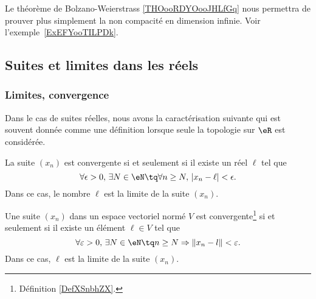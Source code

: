 Le théorème de Bolzano-Weierstrass \ref{THOooRDYOooJHLfGq} nous permettra de prouver plus simplement la non compacité en dimension infinie. Voir l'exemple~\ref{ExEFYooTILPDk}.


\subsection{Suites et limites dans les réels}

\subsubsection{Limites, convergence}

Dans le cas de suites réelles, nous avons la caractérisation suivante qui est souvent donnée comme une définition lorsque seule la topologie sur \( \eR\) est considérée.
\begin{proposition}	\label{PropLimiteSuiteNum}
	La suite $(x_n)$ est convergente si et seulement si il existe un réel $\ell$ tel que
	\begin{equation}		\label{EqDefLimSuite}
		\forall \epsilon>0,\,\exists N\in\eN\tq\forall n\geq N,\,| x_n-\ell |<\epsilon.
	\end{equation}
	Dans ce cas, le nombre $\ell$ est la limite de la suite $(x_n)$.
\end{proposition}

\begin{proposition}		\label{PROPooOSXCooJWXkWH}
    Une suite $(x_n)$ dans un espace vectoriel normé $V$ est convergente\footnote{Définition \ref{DefXSnbhZX}.} si et seulement si il existe un élément $\ell\in V$ tel que
	\begin{equation}
		\forall \varepsilon>0,\,\exists N\in\eN\tq n\geq N\Rightarrow \| x_n-l \|<\varepsilon.
	\end{equation}
	Dans ce cas, $\ell$ est la limite de la suite $(x_n)$.
\end{proposition}

